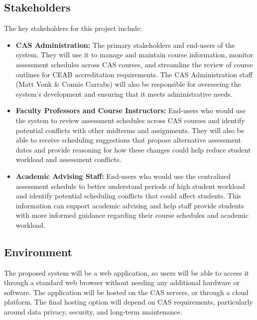 \documentclass{article}
\begin{document}
\subsection{Stakeholders}

The key stakeholders for this project include:
\begin{itemize}
    \item \textbf{CAS Administration:} The primary stakeholders and end-users of
    the system. They will use it to manage and maintain course information, monitor
    assessment schedules across CAS courses, and streamline the review of course
    outlines for CEAB accreditation requirements. The CAS Administration staff (Matt Vonk \& Connie Carrabs) 
    will also be responsible for overseeing the system's development and ensuring that it meets
    administrative needs.

    \item \textbf{Faculty Professors and Course Instructors:} End-users who would use the system to 
    review assessment schedules across CAS courses and identify potential conflicts with other midterms and 
    assignments. They will also be able to receive scheduling suggestions that propose alternative 
    assessment dates and provide reasoning for how these changes could help reduce student workload 
    and assessment conflicts.

    \item \textbf{Academic Advising Staff:} End-users who would use the centralized assessment schedule 
    to better understand periods of high student workload and identify potential scheduling conflicts that 
    could affect students. This information can support academic advising and help staff provide students 
    with more informed guidance regarding their course schedules and academic workload.
\end{itemize}

\subsection{Environment}


The proposed system will be a web application, so users will be able to access
it through a standard web browser without needing any additional hardware or
software. The application will be hosted on the CAS servers, or through a cloud
platform. The final hosting option will depend on CAS requirements, particularly
around data privacy, security, and long-term maintenance.
\end{document}
